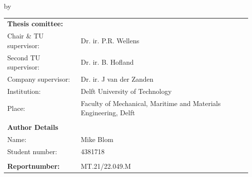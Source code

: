 \begin{titlepage}

\begin{center}

{\makeatletter
{}
\makeatother}

\bigskip

{\makeatletter
\largetitlestyle\fontsize{25}{25}\selectfont\@title
\makeatother}

{\makeatletter
\ifdefvoid{\@subtitle}{}{\titlestyle\fontsize{20}{20}\selectfont\@subtitle}
\makeatother}

\bigskip
\bigskip

by

\bigskip
\bigskip

{\makeatletter
\largetitlestyle\fontsize{25}{25}\selectfont\@author
\makeatother}




\vfill

\begin{tabular}{ll}
    \textbf{Thesis comittee:}\\
    Chair \& TU supervisor: & Dr. ir. P.R. Wellens \\
    Second TU supervisor: & Dr. ir. B. Hofland\\
    Company supervisor: & Dr. ir. J van der Zanden \\
    Institution: & Delft University of Technology \\
    Place: & Faculty of Mechanical, Maritime and Materials Engineering, Delft \\
    \\
    \textbf{Author Details}\\
    Name: & Mike Blom\\
    Student number: & 4381718\\
    \\
     \textbf{Reportnumber:}
     &MT.21/22.049.M
    
\end{tabular}

\vspace{1cm}


\end{center}
\end{titlepage}
